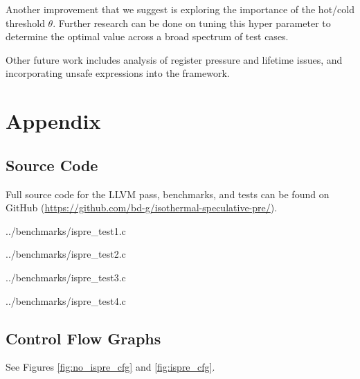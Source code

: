 \documentclass[sigplan,screen]{acmart}
\begin{document}
 Another improvement that we suggest is exploring the importance of the hot/cold threshold $\theta$. Further research can be done on tuning this hyper parameter to determine the optimal value across a broad spectrum of test cases.

 Other future work includes analysis of register pressure and lifetime issues, and incorporating unsafe expressions into the framework.

 

 \section{Appendix}
	\label{sec:appendix}

 \subsection{Source Code}
 \label{app:code}

 Full source code for the LLVM pass, benchmarks, and tests can be found on GitHub (\url{https://github.com/bd-g/isothermal-speculative-pre/}).


{../benchmarks/ispre_test1.c}


{../benchmarks/ispre_test2.c}


{../benchmarks/ispre_test3.c}


{../benchmarks/ispre_test4.c}

\subsection{Control Flow Graphs}

See Figures \ref{fig:no_ispre_cfg} and \ref{fig:ispre_cfg}.
\end{document}
